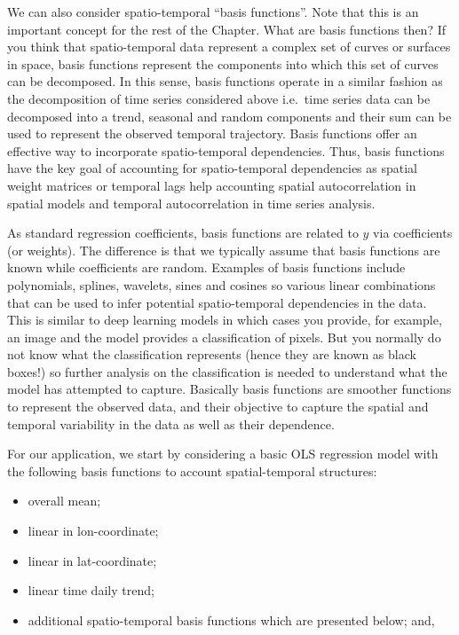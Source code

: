 \documentclass[
  letterpaper,
  krantz2]{style/krantz}
\providecommand{\tightlist}{%
  \setlength{\itemsep}{0pt}\setlength{\parskip}{0pt}}\usepackage{longtable,booktabs,array}
\begin{document}
We can also consider spatio-temporal ``basis functions''. Note that this
is an important concept for the rest of the Chapter. What are basis
functions then? If you think that spatio-temporal data represent a
complex set of curves or surfaces in space, basis functions represent
the components into which this set of curves can be decomposed. In this
sense, basis functions operate in a similar fashion as the decomposition
of time series considered above i.e.~time series data can be decomposed
into a trend, seasonal and random components and their sum can be used
to represent the observed temporal trajectory. Basis functions offer an
effective way to incorporate spatio-temporal dependencies. Thus, basis
functions have the key goal of accounting for spatio-temporal
dependencies as spatial weight matrices or temporal lags help accounting
spatial autocorrelation in spatial models and temporal autocorrelation
in time series analysis.

As standard regression coefficients, basis functions are related to
\(y\) via coefficients (or weights). The difference is that we typically
assume that basis functions are known while coefficients are random.
Examples of basis functions include polynomials, splines, wavelets,
sines and cosines so various linear combinations that can be used to
infer potential spatio-temporal dependencies in the data. This is
similar to deep learning models in which cases you provide, for example,
an image and the model provides a classification of pixels. But you
normally do not know what the classification represents (hence they are
known as black boxes!) so further analysis on the classification is
needed to understand what the model has attempted to capture. Basically
basis functions are smoother functions to represent the observed data,
and their objective to capture the spatial and temporal variability in
the data as well as their dependence.

For our application, we start by considering a basic OLS regression
model with the following basis functions to account spatial-temporal
structures:

\begin{itemize}
\tightlist
\item
  overall mean;
\item
  linear in lon-coordinate;
\item
  linear in lat-coordinate;
\item
  linear time daily trend;
\item
  additional spatio-temporal basis functions which are presented below;
  and,
\end{itemize}
\end{document}
